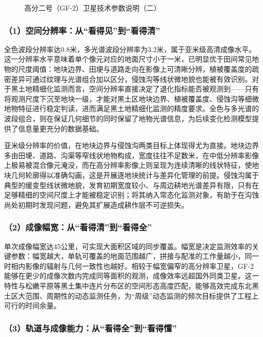 \begin{figure}[htbp]
    \centering
    \caption{高分二号（GF-2）卫星技术参数说明（二）}
    \label{fig:4b}
\end{figure}

\subsubsection{（1）空间分辨率：从“看得见”到“看得清”}

全色波段分辨率达0.8米，多光谱波段分辨率为3.2米，属于亚米级高清成像水平。这一分辨率水平意味着单个像元对应的地面尺寸小于一米，已明显优于田间常见地物的尺度阈值：地块边界、田埂与道路走向在影像上可清晰分辨，植被覆盖度的疏密差异可通过纹理与光谱组合加以区分，侵蚀沟等线状微地貌也能被有效识别。对于黑土地精细化监测而言，空间分辨率直接决定了退化指标能否被观测到——只有将观测尺度下沉至地块一级，才能对黑土区地块边界、植被覆盖度、侵蚀沟等细微地物特征进行稳定判读，进而满足黑土地精细化监测的精度要求。全色与多光谱的波段组合，则在保证几何细节的同时保留了地物光谱信息，为后续变化检测模型提供了信息量更充分的数据基础。

亚米级分辨率的价值，在地块边界与侵蚀沟两类目标上体现得尤为直接。地块边界多由田埂、道路、沟渠等窄线状地物构成，宽度往往不足数米，在中低分辨率影像上极易被混合像元淹没，而在高分辨率影像上则呈现为连续清晰的线状特征，使地块几何轮廓得以准确勾画，这是开展逐地块统计与差异化管理的前提。侵蚀沟属于典型的缓变型线状微地貌，发育初期宽度较小、与周边耕地光谱差异有限，只有在足够精细的空间尺度上才能被稳定识别；将其纳入常态化监测对象，有助于在沟蚀尚处初期时发现问题，避免其扩展造成耕作层不可逆损失。

\subsubsection{（2）成像幅宽：从“看得清”到“看得全”}

单次成像幅宽达45公里，可实现大面积区域的同步覆盖。幅宽是决定监测效率的关键参数：幅宽越大，单轨可覆盖的地面范围越广，拼接与配准的工作量越小，同一时相内影像的辐射与几何一致性也越好。相较于幅宽偏窄的高分辨率卫星，GF-2能够在更少的成像次数内完成同等面积的观测，成像效率远超国外同类卫星。这一特性与松嫩平原等黑土集中连片分布区的空间形态高度匹配，能够高效完成东北黑土区大范围、周期性的动态监测任务，为“周级”动态监测的频次目标提供了工程上可行的时间余量。

\subsubsection{（3）轨道与成像能力：从“看得全”到“看得懂”}

